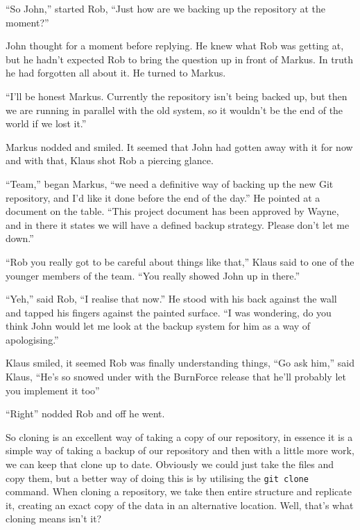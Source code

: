 \begin{trenches}
``So John,'' started Rob, ``Just how are we backing up the repository at the moment?''

John thought for a moment before replying.  He knew what Rob was getting at, but he hadn't expected Rob to bring the question up in front of Markus.  In truth he had forgotten all about it.  He turned to Markus.

``I'll be honest Markus.  Currently the repository isn't being backed up, but then we are running in parallel with the old system, so it wouldn't be the end of the world if we lost it.''

Markus nodded and smiled.  It seemed that John had gotten away with it for now and with that, Klaus shot Rob a piercing glance.  

``Team,'' began Markus, ``we need a definitive way of backing up the new Git repository, and I'd like it done before the end of the day.''  He pointed at a document on the table.  ``This project document has been approved by Wayne, and in there it states we will have a defined backup strategy.  Please don't let me down.''

\thoughtbreak

``Rob you really got to be careful about things like that,'' Klaus said to one of the younger members of the team.  ``You really showed John up in there.''  

``Yeh,'' said Rob, ``I realise that now.''  He stood with his back against the wall and tapped his fingers against the painted surface.  ``I was wondering, do you think John would let me look at the backup system for him as a way of apologising.''

Klaus smiled, it seemed Rob was finally understanding things, ``Go ask him,'' said Klaus, ``He's so snowed under with the BurnForce release that he'll probably let you implement it too''

``Right'' nodded Rob and off he went.
\end{trenches}

So cloning is an excellent way of taking a copy of our repository, in essence it is a simple way of taking a backup of our repository and then with a little more work, we can keep that clone up to date.  Obviously we could just take the files and copy them, but a better way of doing this is by utilising the \texttt{git clone} command.  When cloning a repository, we take then entire structure and replicate it, creating an exact copy of the data in an alternative location.  Well, that's what cloning means isn't it?

